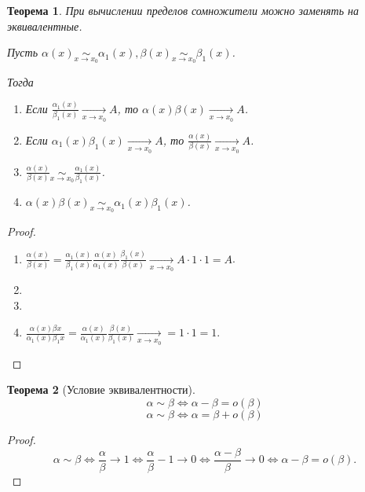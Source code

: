 \documentclass{article}
\newtheorem{Theorem}{Теорема}[section]
\begin{document}
\begin{Theorem}
При вычислении пределов сомножители можно заменять на эквивалентные.

Пусть $\alpha(x) \underset{x \rightarrow x_0}{\sim} \alpha_1(x), \beta(x) \underset{x \rightarrow x_0}{\sim} \beta_1(x)$.

Тогда
\begin{enumerate}
  \item Если $\frac{\alpha_1(x)}{\beta_1(x)} \xrightarrow[x \rightarrow x_0]{} A$, то $\alpha(x)\beta(x) \xrightarrow[x \rightarrow x_0]{} A$.
  \item Если $\alpha_1(x) \beta_1(x) \xrightarrow[x \rightarrow x_0]{} A$, то $\frac{\alpha(x)}{\beta(x)} \xrightarrow[x \rightarrow x_0]{} A$.
  \item $\frac{\alpha(x)}{\beta(x)} \underset{x \rightarrow x_0}{\sim} \frac{\alpha_1(x)}{\beta_1(x)}$.
  \item $\alpha(x) \beta(x) \underset{x \rightarrow x_0}{\sim} \alpha_1(x) \beta_1(x)$.
\end{enumerate}
\end{Theorem}

\begin{proof}
\begin{enumerate}
  \item $\frac{\alpha(x)}{\beta(x)} = \frac{\alpha_1(x)}{\beta_1(x)} \frac{\alpha(x)}{\alpha_1(x)} \frac{\beta_1(x)}{\beta(x)} \xrightarrow[x \rightarrow x_0]{} A \cdot 1 \cdot 1 = A$.
  \item
  \item
  \item $\frac{\alpha(x) \beta{x}}{\alpha_1(x) \beta_1{x}} = \frac{\alpha(x)}{\alpha_1(x)} \frac{\beta(x)}{\beta_1(x)} \xrightarrow[x \rightarrow x_0]{} = 1 \cdot 1 = 1.$
\end{enumerate}
\end{proof}

\begin{Theorem}[Условие эквивалентности]
$$\alpha \sim \beta \Leftrightarrow \alpha - \beta = o(\beta)$$
$$\alpha \sim \beta \Leftrightarrow \alpha = \beta + o(\beta)$$
\end{Theorem}

\begin{proof}
$$\alpha \sim \beta \Leftrightarrow \frac{\alpha}{\beta} \rightarrow 1 \Leftrightarrow \frac{\alpha}{\beta} - 1 \rightarrow 0 \Leftrightarrow \frac{\alpha - \beta}{\beta} \rightarrow 0 \Leftrightarrow \alpha - \beta = o(\beta).$$
\end{proof}
\end{document}
